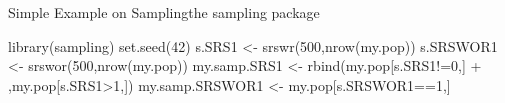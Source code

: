\documentclass[11pt,german,hideothersubsections]{beamer}
\begin{document}
\begin{frame}[fragile]{Simple Example on Sampling}{the sampling package}
\begin{Schunk}
\begin{Sinput}
 library(sampling)
 set.seed(42)
 s.SRS1 <- srswr(500,nrow(my.pop))
 s.SRSWOR1 <- srswor(500,nrow(my.pop)) 
 my.samp.SRS1 <- rbind(my.pop[s.SRS1!=0,]
+                       ,my.pop[s.SRS1>1,])
 my.samp.SRSWOR1 <- my.pop[s.SRSWOR1==1,]
\end{Sinput}
\end{Schunk}
\end{frame}
\end{document}
